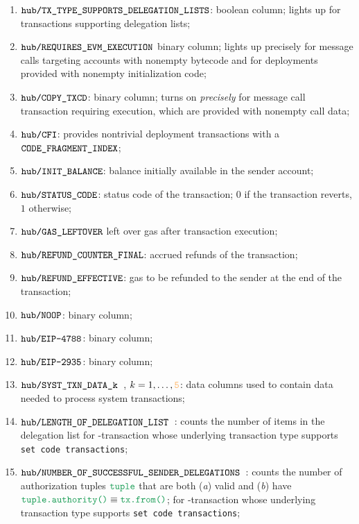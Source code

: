 \begin{enumerate}
	\item
		\markAsJustifiedHere{}
		$\texttt{hub}\texttt{/}{\texttt{\texttt{TX\_TYPE\_SUPPORTS\_DELEGATION\_LISTS}}}$:
		boolean column;
		lights up for transactions supporting delegation lists;
	\item
		\markAsPartiallyJustifiedHere{}
		$\texttt{hub}\texttt{/}{\texttt{\texttt{REQUIRES\_EVM\_EXECUTION}}}$
		binary column;
		lights up precisely for message calls targeting accounts with nonempty bytecode
		and for deployments provided with nonempty initialization code;
	\item
		\markAsJustifiedHere{}
		$\texttt{hub}\texttt{/}{\texttt{\texttt{COPY\_TXCD}}}$:
		binary column;
		turns on \emph{precisely}
		for message call transaction
		requiring \evm{} execution,
		which are provided with nonempty call data;
	\item
		\markAsExtractedFromHub{}
		$\texttt{hub}\texttt{/}{\texttt{\texttt{CFI}}}$:
		provides nontrivial deployment transactions with a $\texttt{CODE\_FRAGMENT\_INDEX}$;
	\item
		\markAsExtractedFromHub{}
		$\texttt{hub}\texttt{/}{\texttt{\texttt{INIT\_BALANCE}}}$:
		balance initially available in the sender account;
	\item
		\markAsExtractedFromHub{}
		$\texttt{hub}\texttt{/}{\texttt{\texttt{STATUS\_CODE}}}$:
		status code of the transaction;
		$0$ if the transaction reverts,
		$1$ otherwise;
	\item
		\markAsExtractedFromHub{}
		$\texttt{hub}\texttt{/}{\texttt{\texttt{GAS\_LEFTOVER}}}$
		left over gas after transaction execution;
	\item
		\markAsExtractedFromHub{}
		$\texttt{hub}\texttt{/}{\texttt{\texttt{REFUND\_COUNTER\_FINAL}}}$:
		accrued refunds of the transaction;
	\item
		\markAsJustifiedHere{}
		$\texttt{hub}\texttt{/}{\texttt{\texttt{REFUND\_EFFECTIVE}}}$:
		gas to be refunded to the sender at the end of the transaction;
	\item
		\markAsExtractedFromHub{}
		$\texttt{hub}\texttt{/}{\texttt{\texttt{NOOP}}}$:
		binary column;
	\item
		\markAsExtractedFromHub{}
		$\texttt{hub}\texttt{/}{\texttt{\texttt{EIP-4788}}}$:
		binary column;
	\item
		\markAsExtractedFromHub{}
		$\texttt{hub}\texttt{/}{\texttt{\texttt{EIP-2935}}}$:
		binary column;
	\item
		\markAsExtractedFromHub{}
		$\texttt{hub}\texttt{/}{\texttt{\texttt{SYST\_TXN\_DATA\_k} }}$,
		$k = 1, \dots, \txnDataHubNumberOfDataColumns$:
		data columns used to contain data needed to process system transactions;
	\item
		\markAsExtractedFromHub{}
		$\texttt{hub}\texttt{/}{\texttt{\texttt{LENGTH\_OF\_DELEGATION\_LIST} }}$:
		counts the number of items in the delegation list
		for \user{}-transaction whose underlying transaction type supports
		\texttt{set code transactions};
	\item
		\markAsExtractedFromHub{}
		$\texttt{hub}\texttt{/}{\texttt{\texttt{NUMBER\_OF\_SUCCESSFUL\_SENDER\_DELEGATIONS} }}$:
		counts the number of authorization tuples $\loc{tuple}$ that are both
		(\emph{a}) valid and
		(\emph{b}) have $\loc{tuple.authority()} \equiv \loc{tx.from()}$;
		for \user{}-transaction whose underlying transaction type supports
		\texttt{set code transactions};
\end{enumerate}
